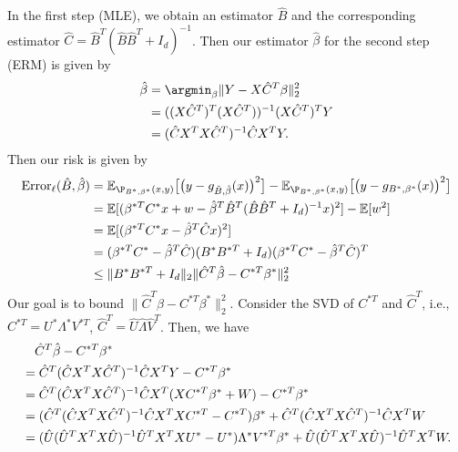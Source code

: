 In the first step (MLE), we obtain an estimator $\hat{B}$ and the corresponding estimator $\hat{C}=\hat{B}^{T}(\hat{B}\hat{B}^{T}+I_{d})^{-1}$. Then our estimator $\hat{\beta}$ for the second step (ERM) is given by 
\begin{align}
\hat{\beta} &= \argmin_{\beta} \|Y-X\hat{C}^{T}\beta\|_{2}^{2} \notag \\
&= ((X\hat{C}^{T})^{T}(X\hat{C}^{T}))^{-1}(X\hat{C}^{T})^{T}Y \notag \\
&= (\hat{C}X^{T}X\hat{C}^{T})^{-1}\hat{C}X^{T}Y.
\end{align}
Then our risk is given by
\begin{align}
{\rm Error}_{\ell}(\hat B,\hat\beta)&= \mathbb{E}_{\P_{B^* ,\beta^* }(x,y)}\big[\big(y-g_{\hat B,\hat\beta}(x)\big)^2\big]-\mathbb{E}_{\P_{B^* ,\beta^* }(x,y)}\big[\big(y-g_{B^* ,\beta^* }(x)\big)^2\big] \notag \\
&= \mathbb{E}[(\beta^{* T}C^{*}x + w - \hat{\beta}^{T}\hat{B}^{T}(\hat{B}\hat{B}^{T}+ I_d)^{-1}x)^{2}] - \mathbb{E}[w^{2}] \notag \\
&= \mathbb{E} [(\beta^{* T}C^{*}x - \hat{\beta}^{T}\hat{C}x)^2] \notag \\
&= (\beta^{* T}C^{*}-\hat{\beta}^{T}\hat{C}) (B^{*}B^{* T}+I_{d})     (\beta^{* T}C^{*}-\hat{\beta}^{T}\hat{C})^{T} \notag \\
& \leq \|B^{*}B^{* T}+I_{d}\|_{2} \|\hat{C}^{T}\hat{\beta}- C^{* T}\beta^{*}\|_{2}^{2}
\end{align}
Our goal is to bound $\|\hat{C}^{T}\hat{\beta}- C^{* T}\beta^{*}\|_{2}^{2}$. Consider the SVD of $C^{* T}$ and $\hat{C}^{T}$, i.e., $C^{* T}=U^{*}\Lambda^{*}V^{* T}$, $\hat{C}^{T}=\hat{U}\hat{\Lambda}\hat{V}^T$. Then, we have
\begin{align}
& \quad \hat{C}^{T}\hat{\beta}- C^{* T}\beta^{*} \notag \\  
&= \hat{C}^{T}(\hat{C}X^{T}X\hat{C}^{T})^{-1}\hat{C}X^{T}Y-C^{* T}\beta^{*} \notag \\ 
& = \hat{C}^{T}(\hat{C}X^{T}X\hat{C}^{T})^{-1}\hat{C}X^{T}(X C^{* T} \beta^{*} + W)-C^{* T}\beta^{*} \notag \\
& = (\hat{C}^{T}(\hat{C}X^{T}X\hat{C}^{T})^{-1}\hat{C}X^{T}X C^{* T} - C^{* T})\beta^{*} + \hat{C}^{T}(\hat{C}X^{T}X\hat{C}^{T})^{-1}\hat{C} X^{T} W \notag \\
&= (\hat{U}(\hat{U}^{T}X^{T}X\hat{U})^{-1}\hat{U}^{T}X^{T}X U^{*} - U^{*})\Lambda^{*}V^{* T} \beta^{*} + \hat{U}(\hat{U}^{T}X^{T}X\hat{U})^{-1}\hat{U}^{T}X^{T} W.
\end{align}
